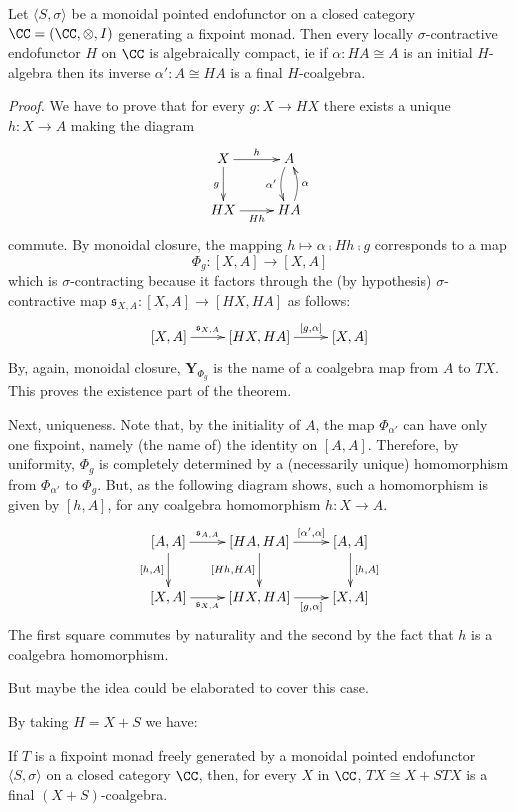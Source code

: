\documentclass[11pt,a4paper]{article}
\newcommand{\tuple}[1]{\langle #1 \rangle }
\newcommand{\efunctor}{S}
\newcommand{\contr}{\sigma}
\newcommand{\fp}{\mathbf{Y}}
\newcommand{\pointedfunctor}{\tuple{\efunctor , \contr}}
\newcommand{\inial}{\alpha '}
\newcommand{\ti}{T}
\newcommand{\esse}{S}
\newcommand{\stre}{\mathfrak{s}}
\newcommand{\lolly}[2]{[#1 ,#2 ]}
\begin{document}
\begin{theorem}
Let $\pointedfunctor$ be a monoidal pointed endofunctor
on a closed category $\CC = (\CC ,\otimes, I)$
generating a fixpoint monad.
Then every locally $\contr$-contractive
endofunctor $H$ on $\CC$ is algebraically compact,
ie if $\alpha :HA\cong A$ is an initial $H$-algebra then
its inverse $\inial :A \cong HA$ is a
final $H$-coalgebra.

\emph{Proof.}
We have to prove that for every $g: X\rightarrow HX$
there exists a unique $h: X\rightarrow A$ making the diagram
$$\xymatrix{
X \ar[r]^-h  \ar[d]_g & A  \ar@/_/[d]_-{\inial}
\\
HX \ar[r]_-{Hh} 
   & HA \ar@/_/[u]_-{\alpha} 
}
$$
commute.
By monoidal closure,
the mapping $h \mapsto \alpha \comp Hh \comp g$
corresponds to a map
$$\Phi_g : \lolly{X}{A} \rightarrow \lolly{X}{A}$$
which is $\contr$-contracting because it factors
through the (by hypothesis) $\contr$-contractive map 
$\stre_{X,A} : \lolly{X}{A} \rightarrow \lolly{HX}{HA}$
as follows:
$$\xymatrix{
\lolly{X}{A} \ar[r]^-{\stre_{X,A}}
 & \lolly{HX}{HA} \ar[r]^-{\lolly{g}{\alpha}}
 & \lolly{X}{A}
}
$$
By, again, monoidal closure,
$\fp_{\Phi_g}$ is the name of a coalgebra map
from $A$ to $\ti X$.
This proves the existence part of the theorem.

Next, uniqueness.
Note that, by the initiality of $A$,
the map $\Phi_{\inial}$ can have only one fixpoint,
namely (the name of) the identity on $\lolly{A}{A}$.
Therefore, by uniformity, 
$\Phi_g$ is completely determined by
a (necessarily unique) homomorphism
from
$\Phi_{\inial}$ to $\Phi_g$.
But, as the following diagram shows, 
such a homomorphism is given by
$\lolly{h}{A}$,
for any coalgebra
homomorphism $h: X \rightarrow A$.
$$\xymatrix{
\lolly{A}{A} \ar[r]^-{\stre_{A,A}} \ar[d]_-{\lolly{h}{A}}
 & \lolly{HA}{HA} \ar[r]^-{\lolly{\alpha '}{\alpha}} \ar[d]_-{\lolly{Hh}{HA}}
 & \lolly{A}{A} \ar[d]^-{\lolly{h}{A}}
\\
\lolly{X}{A} \ar[r]_-{\stre_{X,A}}
 & \lolly{HX}{HA} \ar[r]_-{\lolly{g}{\alpha}}
 & \lolly{X}{A}
}
$$
The first square commutes by naturality and the second
by the fact that $h$ is a coalgebra homomorphism.
\close
\end{theorem}

\begin{remark}
But maybe the idea could be elaborated to cover this case.
\end{remark}


By taking $H=X+S$ we have:
\begin{corollary}
If $\ti$ is a fixpoint monad freely generated by
a monoidal pointed endofunctor
$\pointedfunctor$ on a closed category $\CC$,
then, for every $X$ in $\CC$,
$\ti X\cong X+\esse \ti X$ is a 
final $(X+\esse )$-coalgebra.
\end{corollary}
\end{document}
